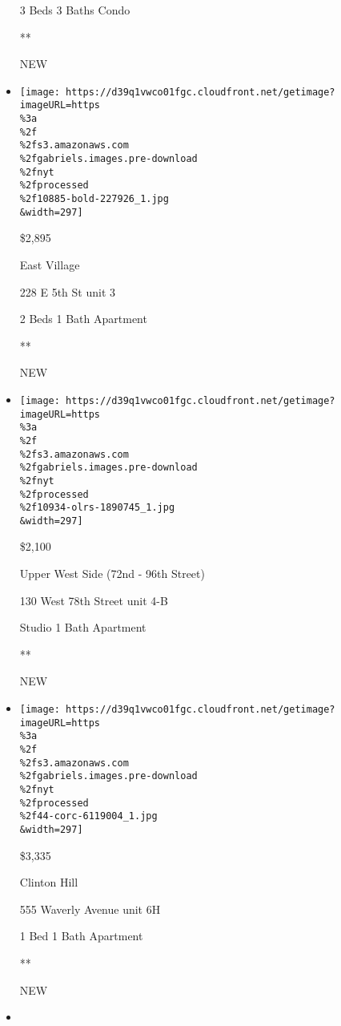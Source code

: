 \begin{itemize}
  3 Beds \textbar{} 3 Baths \textbar{} Condo

  **

  NEW
\item
  \href{/real-estate/usa/ny/new-york/east-village/homes-for-rent/228-e-5th-st/10885-BOLD-227926?}{}

  \texttt{[image: https://d39q1vwco01fgc.cloudfront.net/getimage?imageURL=https\\\%3a\\\%2f\\\%2fs3.amazonaws.com\\\%2fgabriels.images.pre-download\\\%2fnyt\\\%2fprocessed\\\%2f10885-bold-227926\_1.jpg\\\&width=297]}

  \$2,895

  East Village

  228 E 5th St unit 3

  2 Beds \textbar{} 1 Bath \textbar{} Apartment

  **

  NEW
\item
  \href{/real-estate/usa/ny/new-york/upper-west-side-72nd---96th-street/homes-for-rent/130-west-78th-street/10934-OLRS-1890745?}{}

  \texttt{[image: https://d39q1vwco01fgc.cloudfront.net/getimage?imageURL=https\\\%3a\\\%2f\\\%2fs3.amazonaws.com\\\%2fgabriels.images.pre-download\\\%2fnyt\\\%2fprocessed\\\%2f10934-olrs-1890745\_1.jpg\\\&width=297]}

  \$2,100

  Upper West Side (72nd - 96th Street)

  130 West 78th Street unit 4-B

  Studio \textbar{} 1 Bath \textbar{} Apartment

  **

  NEW
\item
  \href{/real-estate/usa/ny/brooklyn/clinton-hill/homes-for-rent/555-waverly-avenue/44-CORC-6119004?}{}

  \texttt{[image: https://d39q1vwco01fgc.cloudfront.net/getimage?imageURL=https\\\%3a\\\%2f\\\%2fs3.amazonaws.com\\\%2fgabriels.images.pre-download\\\%2fnyt\\\%2fprocessed\\\%2f44-corc-6119004\_1.jpg\\\&width=297]}

  \$3,335

  Clinton Hill

  555 Waverly Avenue unit 6H

  1 Bed \textbar{} 1 Bath \textbar{} Apartment

  **

  NEW
\item
  \href{/real-estate/usa/ny/brooklyn/east-new-york/homes-for-rent/680-hendrix-street/44-6118703?}{}


\end{itemize}
